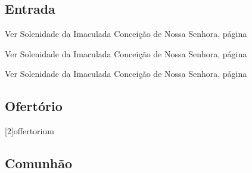 
\subsection{Entrada}\label{subsection:proprium-sanctorum/in-annuntiatione-domini/introitus}

\begin{rubrica}
    Ver Solenidade da Imaculada Conceição de Nossa Senhora, página~\pageref{subsection:proprium-sanctorum/in-conceptione-immaculata-bmv/psalmus-responsorius}
\end{rubrica}

\begin{rubrica}
    Ver Solenidade da Imaculada Conceição de Nossa Senhora, página~\pageref{subsection:proprium-sanctorum/in-conceptione-immaculata-bmv/alleluia}
\end{rubrica}

\begin{rubrica}
    Ver Solenidade da Imaculada Conceição de Nossa Senhora, página~\pageref{subsection:proprium-sanctorum/in-conceptione-immaculata-bmv/psalmus-alleluiaticus}
\end{rubrica}

\AllowPageFlush

\subsection{Ofertório}\label{subsection:proprium-sanctorum/in-annuntiatione-domini/offertorium}
[2]{offertorium}

\subsection{Comunhão}\label{subsection:proprium-sanctorum/in-annuntiatione-domini/communio}
